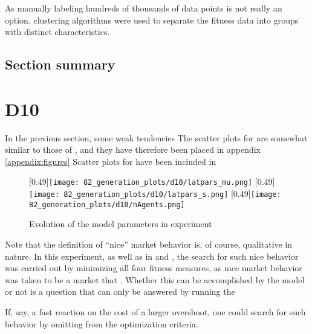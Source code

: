 As manually labeling hundreds of thousands of data points is not really an option, clustering algorithms were used to separate the fitness data into groups with distinct characteristics. 

\subsection{Section summary}


\section{D10}
In the previous section, some weak tendencies 
The scatter plots for \dten{} are somewhat similar to those of \dnine, and they have therefore been placed in appendix \ref{appendix:figures}
Scatter plots for \dten{} have been included in 


\begin{figure}
	\centering
	[0.49\linewidth]{\texttt{[image: 82\_generation\_plots/d10/latpars\_mu.png]}}
	[0.49\linewidth]{\texttt{[image: 82\_generation\_plots/d10/latpars\_s.png]}}
	[0.49\linewidth]{\texttt{[image: 82\_generation\_plots/d10/nAgents.png]}}
	\caption{Evolution of the model parameters in experiment \dten}
	\label{fig:d10_evolution_parameters}
\end{figure}


Note that the definition of ``nice'' market behavior is, of course, qualitative in nature. In this experiment, as well as in \dnine{} and \deleven, the search for such nice behavior was carried out by minimizing all four fitness measures, as nice market behavior was taken to be a market that . Whether this can be accomplished by the model or not is a question that can only be answered by running the 

If, say, a fast reaction on the cost of a larger overshoot, one could search for such behavior by omitting \overshoot{} from the optimization criteria.



